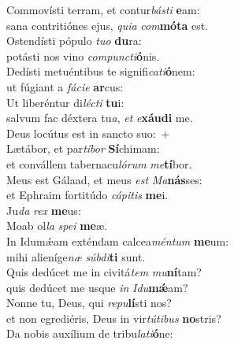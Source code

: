 \evenverse Commovísti terram, et contur\textit{bá}\textit{sti} \textbf{e}am:~\*\\
\evenverse sana contritiónes ejus, \textit{qui}\textit{a} \textit{com}\textbf{mó}\textbf{ta} est.\\
\oddverse Ostendísti pópulo \textit{tu}\textit{o} \textbf{du}ra:~\*\\
\oddverse potásti nos vino \textit{com}\textit{pun}\textit{cti}\textbf{ó}nis.\\
\evenverse Dedísti metuéntibus te signifi\textit{ca}\textit{ti}\textbf{ó}nem:~\*\\
\evenverse ut fúgiant a \textit{fá}\textit{ci}\textit{e} \textbf{ar}cus:\\
\oddverse Ut liberéntur di\textit{lé}\textit{cti} \textbf{tu}i:~\*\\
\oddverse salvum fac déxtera tu\textit{a}, \textit{et} \textit{e}\textbf{xáu}\textbf{di} me.\\
\evenverse Deus locútus est in sancto suo:~+\\
\evenverse  Lætábor, et par\textit{tí}\textit{bor} \textbf{Sí}chimam:~\*\\
\evenverse et convállem tabernacu\textit{ló}\textit{rum} \textit{me}\textbf{tí}bor.\\
\oddverse Meus est Gálaad, et meus \textit{est} \textit{Ma}\textbf{nás}ses:~\*\\
\oddverse et Ephraim fortitúdo \textit{cá}\textit{pi}\textit{tis} \textbf{me}i.\\
\evenverse Ju\textit{da} \textit{rex} \textbf{me}us:~\*\\
\evenverse Moab ol\textit{la} \textit{spe}\textit{i} \textbf{me}æ.\\
\oddverse In Idumǽam exténdam calcea\textit{mén}\textit{tum} \textbf{me}um:~\*\\
\oddverse mihi alieníge\textit{næ} \textit{súb}\textit{di}\textbf{ti} sunt.\\
\evenverse Quis dedúcet me in civitá\textit{tem} \textit{mu}\textbf{ní}tam?~\*\\
\evenverse quis dedúcet me usque \textit{in} \textit{I}\textit{du}\textbf{mǽ}am?\\
\oddverse Nonne tu, Deus, qui \textit{re}\textit{pu}\textbf{lí}sti nos?~\*\\
\oddverse et non egrediéris, Deus in vir\textit{tú}\textit{ti}\textit{bus} \textbf{no}stris?\\
\evenverse Da nobis auxílium de tribu\textit{la}\textit{ti}\textbf{ó}ne:~\*\\
